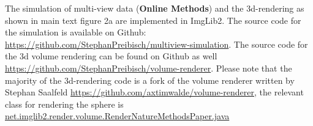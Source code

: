 \documentclass[]{spie}  %
\begin{document}
The simulation of multi-view data (\textbf{Online Methods}) and the 3d-rendering as shown in main text figure 2a are implemented in ImgLib2\cite{PietzschAl12}. The source code for the simulation is available on Github: \url{https://github.com/StephanPreibisch/multiview-simulation}. The source code for the 3d volume rendering can be found on Github as well \url{https://github.com/StephanPreibisch/volume-renderer}. Please note that the majority of the 3d-rendering code is a fork of the volume renderer written by Stephan Saalfeld \url{https://github.com/axtimwalde/volume-renderer}, the relevant class for rendering the sphere is \url{net.imglib2.render.volume.RenderNatureMethodsPaper.java}






\end{document}
